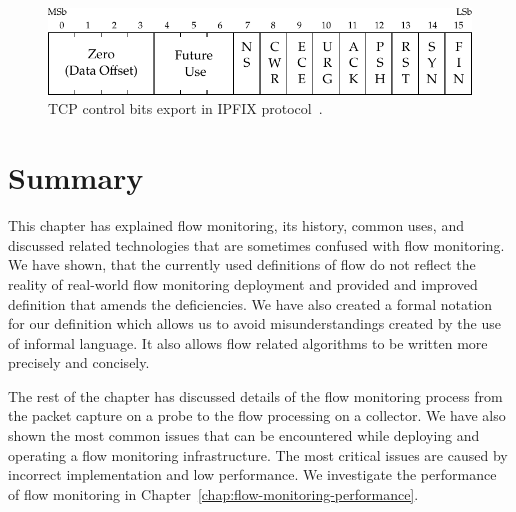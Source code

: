 \begin{figure}
  \begin{center}
    \includegraphics[width=\textwidth]{figures/tcp-flags}
  \end{center}
  \caption{TCP control bits export in IPFIX protocol~\cite{rfc7125}.}
  \label{fig:tcp-flags}
\end{figure}


\section{Summary}\label{sec:nfm-summary}

This chapter has explained flow monitoring, its history, common uses, and discussed related technologies that are sometimes confused with flow monitoring. We have shown, that the currently used definitions of flow do not reflect the reality of real-world flow monitoring deployment and provided and improved definition that amends the deficiencies. We have also created a formal notation for our definition which allows us to avoid misunderstandings created by the use of informal language. It also allows flow related algorithms to be written more precisely and concisely.

The rest of the chapter has discussed details of the flow monitoring process from the packet capture on a probe to the flow processing on a collector. We have also shown the most common issues that can be encountered while deploying and operating a flow monitoring infrastructure. The most critical issues are caused by incorrect implementation and low performance. We investigate the performance of flow monitoring in Chapter~\ref{chap:flow-monitoring-performance}.
